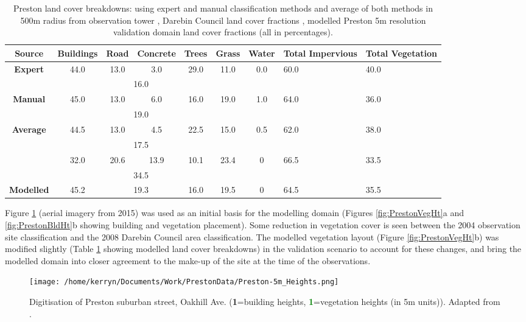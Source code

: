 \documentclass[preprint,12pt,authoryear]{elsarticle}
\begin{document}
\begin{table}[!htbp]
\caption
{Preston land cover breakdowns: using expert and manual classification methods and average of both methods in 500m radius from observation tower \citep{Coutts2007}, Darebin Council land cover fractions \citep{Nury2015}, modelled Preston 5m resolution validation domain land cover fractions (all in percentages). \label{tab:expertValues}} 
  \begin{tabular}{ |c |c| c | c |c |c |c|p{1.65cm}|p{1.65cm}| } 
	\hline \textbf{Source}   & \textbf{Buildings}&	\textbf{Road}&\textbf{Concrete}	&\textbf{Trees}&\textbf{Grass}&\textbf{Water}&\textbf{Total Impervious}&\textbf{Total Vegetation} \\ \hline
 \textbf{Expert}&	44.0&	13.0&	3.0&	29.0&	11.0	&0.0	&	60.0&	40.0 \\ \hline 
 && \multicolumn{2}{|c|}{16.0} 	&&&&&\\ \hline  
 \textbf{Manual}&	45.0	&13.0	&6.0&	16.0&	19.0&	1.0&		64.0&	36.0 \\ \hline
 && \multicolumn{2}{|c|}{19.0} 	&&&&&\\ \hline 
 \textbf{Average} &	44.5&	13.0&	4.5&	22.5&	15.0&	0.5&		62.0&	38.0 \\ \hline
 && \multicolumn{2}{|c|}{17.5} 	&&&&&\\ \hline  
\textbf{\cite{Nury2015}}& 32.0&	20.6&	13.9&	10.1&	23.4&	0&		66.5&	33.5 \\ \hline
 & & \multicolumn{2}{|c|}{34.5} 	&&&&&\\ \hline	
\textbf{Modelled} & 45.2	& \multicolumn{2}{|c|}{19.3} & 16.0	& 19.5 &0& 64.5 &35.5 \\ \hline
  \end{tabular} 
 \end{table}  

Figure \ref{fig:PrestonDigitization} (aerial imagery from 2015) was used as an initial basis for the modelling domain (Figures \ref{fig:PrestonVegHt}a and \ref{fig:PrestonBldHt}b showing building and vegetation placement). Some reduction in vegetation cover is seen between the 2004 observation site classification and the 2008 Darebin Council area classification.  The modelled vegetation layout (Figure \ref{fig:PrestonVegHt}b) was modified slightly (Table \ref{tab:expertValues} showing modelled land cover breakdowns) in the validation scenario to account for these changes, and bring the modelled domain into closer agreement to the make-up of the site at the time of the observations.

\begin{figure}[!htbp]
\texttt{[image: /home/kerryn/Documents/Work/PrestonData/Preston-5m\_Heights.png]}     
\caption[Digitisation of modelled Preston suburban street]{Digitisation of Preston suburban street, Oakhill Ave. (\textbf{1}=building heights, \textbf{\textcolor{green}{1}}=vegetation heights (in 5m units)). Adapted from \cite{Nearmap2015}.\label{fig:PrestonDigitization} }     
\end{figure}    
\end{document}
